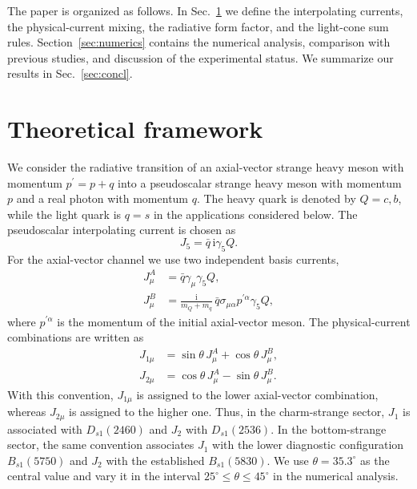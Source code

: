 \documentclass[aps,prd,preprint,nofootinbib,superscriptaddress]{revtex4-2}
\newcommand{\ii}{\mathrm{i}}
\newcommand{\Dsone}{D_{s1}}
\newcommand{\Bsone}{B_{s1}}
\begin{document}
The paper is organized as follows. In Sec.~\ref{sec:framework} we define the
interpolating currents, the physical-current mixing, the radiative form factor,
and the light-cone sum rules. Section~\ref{sec:numerics} contains the numerical
analysis, comparison with previous studies, and discussion of the experimental
status. We summarize our results in Sec.~\ref{sec:concl}.

\section{Theoretical framework}
\label{sec:framework}

We consider the radiative transition of an axial-vector strange heavy meson
with momentum \(p^{\prime}=p+q\) into a pseudoscalar strange heavy meson with momentum
\(p\) and a real photon with momentum \(q\).  The heavy quark is denoted by
\(Q=c,b\), while the light quark is \(q=s\) in the applications considered
below.  The pseudoscalar interpolating current is chosen as
\begin{equation}
  J_5=\bar q\,\ii\gamma_5 Q .
  \label{eq:j5}
\end{equation}
For the axial-vector channel we use two independent basis currents,
\begin{align}
  J^A_\mu &= \bar q\gamma_\mu\gamma_5 Q, \\
  J^B_\mu &= \frac{\ii}{m_Q+m_q}\,
  \bar q\sigma_{\mu\alpha}p^{\prime\alpha}\gamma_5 Q ,
  \label{eq:basis-currents}
\end{align}
where \(p^{\prime\alpha}\) is the momentum of the initial axial-vector meson.  The
physical-current combinations are written as
\begin{align}
  J_{1\mu} &= \sin\theta\,J^A_\mu+\cos\theta\,J^B_\mu,\\
  J_{2\mu} &= \cos\theta\,J^A_\mu-\sin\theta\,J^B_\mu .
  \label{eq:physical-currents}
\end{align}
With this convention, \(J_{1\mu}\) is assigned to the lower axial-vector
combination, whereas \(J_{2\mu}\) is assigned to the higher one.  Thus, in the
charm-strange sector, \(J_1\) is associated with \(\Dsone(2460)\) and \(J_2\)
with \(\Dsone(2536)\).  In the bottom-strange sector, the same convention
associates \(J_1\) with the lower diagnostic configuration \(\Bsone(5750)\)
and \(J_2\) with the established \(\Bsone(5830)\).  We use
\(\theta=35.3^\circ\) as the central value and vary it in the interval
\(25^\circ\leq\theta\leq45^\circ\) in the numerical analysis.
\end{document}
